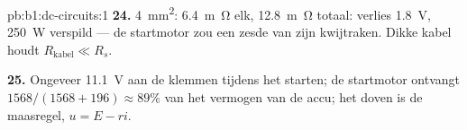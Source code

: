 \begin{solution}{pb:b1:dc-circuits:1}
\textbf{24.} \qty{4}{mm^2}: \qty{6.4}{m\ohm} elk, \qty{12.8}{m\ohm}
totaal: verlies \qty{1.8}{V}, \qty{250}{W} verspild --- de startmotor zou
een zesde van zijn  kwijtraken. Dikke kabel houdt $R_{\text{kabel}} \ll R_s$.

\textbf{25.} Ongeveer \qty{11.1}{V} aan de klemmen tijdens het starten; de
startmotor ontvangt $1568/(1568 + 196) \approx 89\%$ van het vermogen van de
accu; het doven is de maasregel, $u = E - ri$.
\end{solution}
